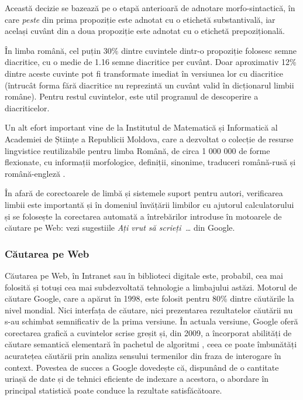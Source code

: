 \documentclass[]{../../metanetpaper}
\begin{document}
\begin{multicols}{2}
Această decizie se bazează pe o etapă anterioară de adnotare morfo-sintactică, în care \textit{peste} din prima propoziție este adnotat cu o etichetă substantivală, iar același cuvânt din a doua propoziție este adnotat cu o etichetă prepozițională.

În limba română, cel puțin 30\% dintre cuvintele dintr-o propoziție folosesc semne diacritice, cu o medie de 1.16 semne diacritice per cuvânt. Doar aproximativ 12\% dintre aceste cuvinte pot fi transformate imediat în versiunea lor cu diacritice (întrucât forma fără diacritice nu reprezintă un cuvânt valid în dicționarul limbii române). Pentru restul cuvintelor, este util programul de descoperire a diacriticelor.

Un alt efort important vine de la Institutul de Matematică și Informatică al Academiei de Științe a Republicii Moldova, care a dezvoltat o colecție de resurse lingvistice reutilizabile pentru limba Română, de circa 1 000 000 de forme flexionate, cu informații morfologice, definiții, sinonime, traduceri română-rusă și română-engleză \cite{elrr}.

În afară de corectoarele de limbă și sistemele suport pentru autori, verificarea limbii este importantă și în domeniul învățării limbilor cu ajutorul calculatorului și se folosește la corectarea automată a întrebărilor introduse în motoarele de căutare pe Web: vezi sugestiile \textit{Ați vrut să scrieți~\dots} din Google.

\subsubsection{Căutarea pe Web}

Căutarea pe Web, în Intranet sau în biblioteci digitale este, probabil, cea mai folosită și totuși cea mai subdezvoltată tehnologie a limbajului astăzi. Motorul de căutare Google, care a apărut în 1998, este folosit pentru 80\% dintre căutările la nivel mondial\cite{spi1}. Nici interfața de căutare, nici prezentarea rezultatelor căutării nu s-au schimbat semnificativ de la prima versiune. În actuala versiune, Google oferă corectarea grafică a cuvintelor scrise greșit și, din 2009, a încorporat abilități de căutare semantică elementară în pachetul de algoritmi \cite{pc1}, ceea ce poate îmbunătăți acuratețea căutării prin analiza sensului termenilor din fraza de interogare în context. Povestea de succes a Google dovedește că, dispunând de o cantitate uriașă de date și de tehnici eficiente de indexare a acestora, o abordare în principal statistică poate conduce la rezultate satisfăcătoare.


\end{multicols}
\end{document}
